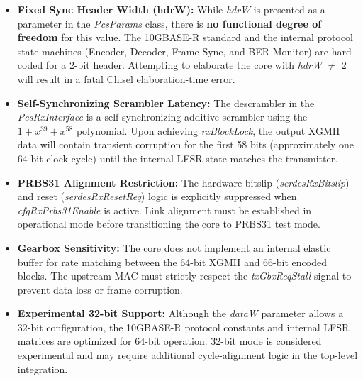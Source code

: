 \begin{itemize}[noitemsep]
    \item \textbf{Fixed Sync Header Width (hdrW):} 
    While \textit{hdrW} is presented as a parameter in the \textit{PcsParams} class, there is \textbf{no functional degree of freedom} for this value. The 10GBASE-R standard and the internal protocol state machines (Encoder, Decoder, Frame Sync, and BER Monitor) are hard-coded for a 2-bit header. Attempting to elaborate the core with \textit{hdrW} $\neq$ 2 will result in a fatal Chisel elaboration-time error.
    
    \item \textbf{Self-Synchronizing Scrambler Latency:} 
    The descrambler in the \textit{PcsRxInterface} is a self-synchronizing additive scrambler using the $1 + x^{39} + x^{58}$ polynomial. Upon achieving \textit{rxBlockLock}, the output XGMII data will contain transient corruption for the first 58 bits (approximately one 64-bit clock cycle) until the internal LFSR state matches the transmitter.
    
    \item \textbf{PRBS31 Alignment Restriction:} 
    The hardware bitslip (\textit{serdesRxBitslip}) and reset (\textit{serdesRxResetReq}) logic is explicitly suppressed when \textit{cfgRxPrbs31Enable} is active. Link alignment must be established in operational mode before transitioning the core to PRBS31 test mode.
    
    \item \textbf{Gearbox Sensitivity:} 
    The core does not implement an internal elastic buffer for rate matching between the 64-bit XGMII and 66-bit encoded blocks. The upstream MAC must strictly respect the \textit{txGbxReqStall} signal to prevent data loss or frame corruption.
    
    \item \textbf{Experimental 32-bit Support:} 
    Although the \textit{dataW} parameter allows a 32-bit configuration, the 10GBASE-R protocol constants and internal LFSR matrices are optimized for 64-bit operation. 32-bit mode is considered experimental and may require additional cycle-alignment logic in the top-level integration.
\end{itemize}